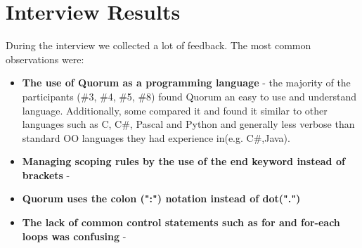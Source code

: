 \section{Interview Results}
During the interview we collected a lot of feedback. The most common observations were:

\begin{itemize}
\item \textbf{The use of Quorum as a programming language} - the majority of the participants (\#3, \#4, \#5, \#8) found Quorum an easy to use and understand language. Additionally, some compared it and found it similar to other languages such as C, C\#, Pascal and Python and generally less verbose than standard OO languages they had experience in(e.g. C\#,Java). 
\item \textbf{Managing scoping rules by the use of the end keyword instead of brackets} - 
\item \textbf{Quorum uses the colon (":") notation instead of dot(".")}
\item \textbf{The lack of common control statements such as for and for-each loops was confusing} - 
\end{itemize}